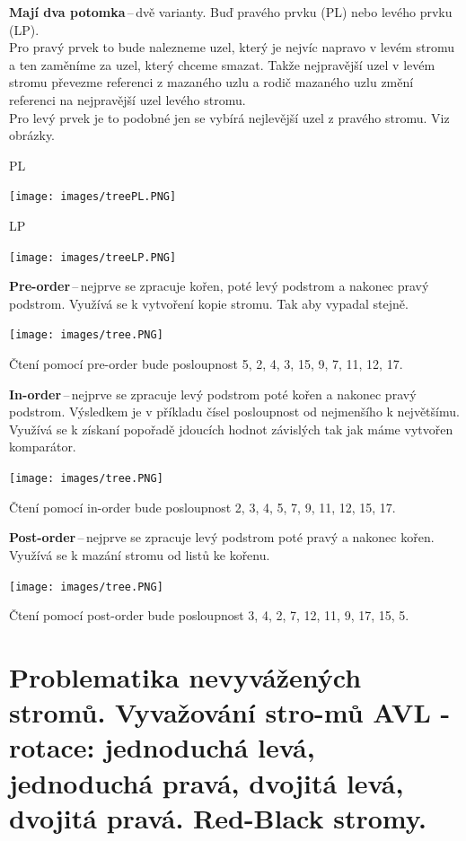 \textbf{Mají dva potomka}\,--\,dvě varianty. Buď pravého prvku (PL) nebo levého prvku (LP).\\
Pro pravý prvek to bude nalezneme uzel, který je nejvíc napravo v levém stromu a ten zaměníme za uzel, který chceme smazat. Takže nejpravější uzel v levém stromu převezme referenci z mazaného uzlu a rodič mazaného uzlu změní referenci na nejpravější uzel levého stromu. \\
Pro levý prvek je to podobné jen se vybírá nejlevější uzel z pravého stromu. Viz obrázky.

PL
\begin{center}
\texttt{[image: images/treePL.PNG]}
\end{center}

LP
\begin{center}
\texttt{[image: images/treeLP.PNG]}
\end{center}



\textbf{Pre-order}\,--\,nejprve se zpracuje kořen, poté levý podstrom a nakonec pravý podstrom. Využívá se k vytvoření kopie stromu. Tak aby vypadal stejně.
\begin{center}
\texttt{[image: images/tree.PNG]}
\end{center}
Čtení pomocí pre-order bude posloupnost 5, 2, 4, 3, 15, 9, 7, 11, 12, 17.

\textbf{In-order}\,--\,nejprve se zpracuje levý podstrom poté kořen a nakonec pravý podstrom. Výsledkem je v příkladu čísel posloupnost od nejmenšího k největšímu. Využívá se k získaní popořadě jdoucích hodnot závislých tak jak máme vytvořen komparátor.
\begin{center}
\texttt{[image: images/tree.PNG]}
\end{center}
Čtení pomocí in-order bude posloupnost 2, 3, 4, 5, 7, 9, 11, 12, 15, 17.

\textbf{Post-order}\,--\,nejprve se zpracuje levý podstrom poté pravý a nakonec kořen. Využívá se k mazání stromu od listů ke kořenu.
\begin{center}
\texttt{[image: images/tree.PNG]}
\end{center}
Čtení pomocí post-order bude posloupnost 3, 4, 2, 7, 12, 11, 9, 17, 15, 5.














\newpage
\section[Problematika nevyvážených stromů. Vyvažování stromů AVL - rotace: jednoduchá levá, jednoduchá pravá, dvojitá levá, dvojitá pravá. Red-Black stromy]{Problematika nevyvážených stromů. Vyvažování stro-mů AVL - rotace: jednoduchá levá, jednoduchá pravá, dvojitá levá, dvojitá pravá. Red-Black stromy.
}

